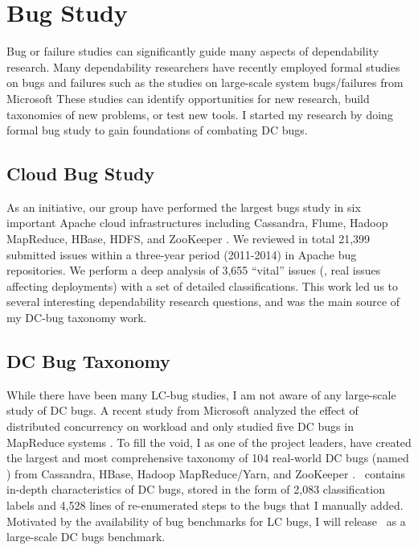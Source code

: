 \section{Bug Study}

Bug or failure studies can significantly guide many aspects of dependability
research. Many dependability researchers have recently employed formal studies
on bugs and failures such as the studies on large-scale system bugs/failures
from Microsoft \cite{Guo+13-CureIsWorse, Li+13-ScopeBugStudy} These studies can
identify opportunities for new research, build taxonomies of new problems, or
test new tools. I started my research by doing formal bug study to gain
foundations of combating DC bugs.

\subsection{Cloud Bug Study}

As an initiative, our group have performed the largest bugs study in six 
important Apache cloud infrastructures including Cassandra, Flume, Hadoop
MapReduce, HBase, HDFS, and ZooKeeper \cite{Gunawi+14-Cbs}. We reviewed in
total 21,399 submitted issues within a three-year period (2011-2014) in Apache
bug repositories. We perform a deep analysis of 3,655 ``vital'' issues (\ie,
real issues affecting deployments) with a set of detailed classifications. This
work led us to several interesting dependability research questions, and was 
the main source of my DC-bug taxonomy work.

\subsection{DC Bug Taxonomy} 

While there have been many LC-bug studies, I am not aware of any large-scale
study of DC bugs. A recent study from Microsoft analyzed the effect of
distributed concurrency on workload and only studied five DC bugs in MapReduce
systems \cite{Xiao+14-NonDetMR}. To fill the void, I as one of the project
leaders, have created the largest and most comprehensive taxonomy of 104
real-world DC bugs (named \taxdc) from Cassandra, HBase, Hadoop MapReduce/Yarn,
and ZooKeeper \cite{Leesatapornwongsa+16-TaxDc}. \taxdc\ contains in-depth
characteristics of DC bugs, stored in the form of 2,083 classification labels
and 4,528 lines of re-enumerated steps to the bugs that I manually added.
Motivated by the availability of bug benchmarks for LC bugs, I will release
\taxdc\ as a large-scale DC bugs benchmark.

